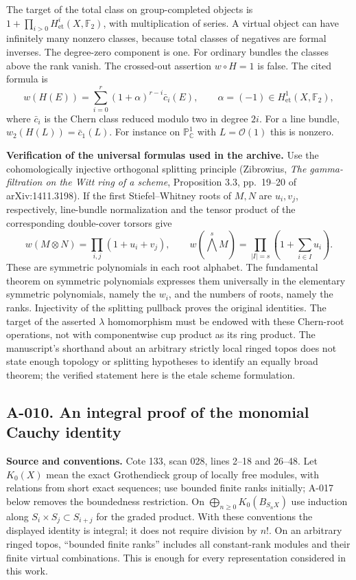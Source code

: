 \documentclass[11pt]{article}
\begin{document}
The target of the total class on group-completed objects is
$1+\prod_{i>0}H^i_{\mathrm{et}}(X,\mathbb F_2)$, with multiplication of
series. A virtual object can have infinitely many nonzero classes,
because total classes of negatives are formal inverses. The degree-zero
component is one. For ordinary bundles the classes above the rank vanish.
The crossed-out assertion $w\circ H=1$ is false. The cited formula is
\[
 w(H(E))=\sum_{i=0}^{r}(1+\alpha)^{r-i}\bar c_i(E),
 \qquad \alpha=(-1)\in H^1_{\mathrm{et}}(X,\mathbb F_2),
\]
where $\bar c_i$ is the Chern class reduced modulo two in degree $2i$.
For a line bundle, $w_2(H(L))=\bar c_1(L)$. For instance on
$\mathbb P^1_{\mathbb C}$ with $L=\mathcal O(1)$ this is nonzero.

\textbf{Verification of the universal formulas used in the archive.}
Use the cohomologically injective orthogonal splitting principle
(Zibrowius, \emph{The gamma-filtration on the Witt ring of a scheme},
Proposition 3.3, pp.~19--20 of arXiv:1411.3198). If the first
Stiefel--Whitney roots of $M,N$ are $u_i,v_j$, respectively, line-bundle
normalization and the tensor product of the corresponding double-cover
torsors give
\[
 w(M\otimes N)=\prod_{i,j}(1+u_i+v_j),\qquad
 w(\bigwedge^sM)=\prod_{|I|=s}\left(1+\sum_{i\in I}u_i\right).
\]
These are symmetric polynomials in each root alphabet. The fundamental
theorem on symmetric polynomials expresses them universally in the
elementary symmetric polynomials, namely the $w_i$, and the numbers of
roots, namely the ranks. Injectivity of the splitting pullback proves
the original identities. The target of the asserted $\lambda$
homomorphism must be endowed with these Chern-root operations, not with
componentwise cup product as its ring product. The manuscript's
shorthand about an arbitrary strictly local ringed topos does not state
enough topology or splitting hypotheses to identify an equally broad
theorem; the verified statement here is the etale scheme formulation.

\subsection*{A-010. An integral proof of the monomial Cauchy identity}
\textbf{Source and conventions.} Cote 133, scan 028, lines 2--18 and
26--48. Let $K_0(X)$ mean the exact Grothendieck group of locally free
modules, with relations from short exact sequences; use bounded finite
ranks initially; A-017 below removes the boundedness restriction.
On $\bigoplus_{n\geq0}K_0(B_{S_nX})$ use induction along
$S_i\times S_j\subset S_{i+j}$ for the graded product. With these
conventions the displayed identity is integral; it does not require
division by $n!$. On an arbitrary ringed topos, ``bounded finite ranks''
includes all constant-rank modules and their finite virtual combinations.
This is enough for every representation considered in this work.
\end{document}
